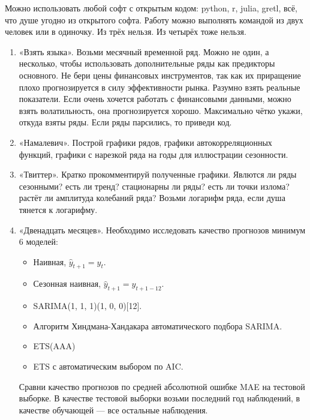 \documentclass[12pt]{article}
\begin{document}
Можно использовать любой софт с открытым кодом: python, r, julia, gretl, всё, что душе угодно из открытого софта. 
Работу можно выполнять командой из двух человек или в одиночку. Из трёх нельзя. Из четырёх тоже нельзя. 

\begin{enumerate}
    \item «Взять языка». Возьми месячный временной ряд. Можно не один, а несколько, чтобы использовать дополнительные ряды как предикторы основного.
    Не бери цены финансовых инструментов, так как их приращение плохо прогнозируется в силу эффективности рынка.
    Разумно взять реальные показатели. Если очень хочется работать с финансовыми данными, можно взять волатильность, 
    она прогнозируется хорошо. Максимально чётко укажи, откуда взяты ряды. Если ряды парсились, то приведи код. 

    \item «Намалевич». Построй графики рядов, графики автокорреляционных функций, графики с нарезкой ряда на годы для иллюстрации сезонности. 
    
    \item «Твиттер». Кратко прокомментируй полученные графики. 
    Явлются ли ряды сезонными? есть ли тренд? стационарны ли ряды? есть ли точки излома? растёт ли амплитуда колебаний ряда?
    Возьми логарифм ряда, если душа тянется к логарифму.


      
    \item «Двенадцать месяцев». Необходимо исследовать качество прогнозов минимум 6 моделей:

    \begin{itemize}
        \item Наивная, $\hat y_{t+1} = y_t$.
        \item Сезонная наивная, $\hat y_{t+1} = y_{t + 1 - 12}$.
        \item SARIMA(1, 1, 1)(1, 0, 0)[12].
        \item Алгоритм Хиндмана-Хандакара автоматического подбора SARIMA.
        \item ETS(AAA)
        \item ETS с автоматическим выбором по AIC.
    \end{itemize}      
    
    Сравни качество прогнозов по средней абсолютной ошибке MAE на тестовой выборке. В качестве тестовой выборки возьми последний год наблюдений,
    в качестве обучающей — все остальные наблюдения. 
    

\end{enumerate}
\end{document}
